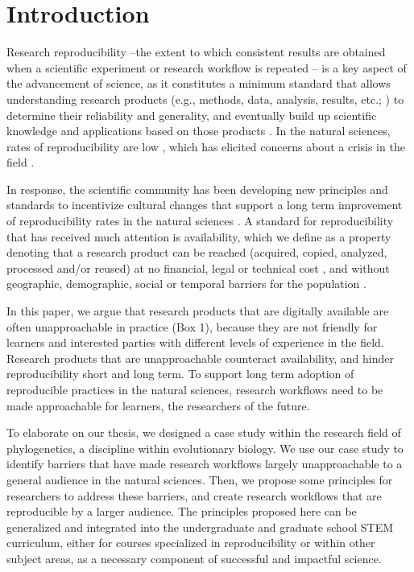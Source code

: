 \documentclass[12pt]{article}
\begin{document}
\newpage
{} %
\section*{Introduction}
\label{sec:intro}

Research reproducibility --the extent to which consistent results are obtained when
a scientific experiment or research workflow is repeated \citep{repdef2021}--
is a key aspect of the advancement
of science, as it constitutes a minimum standard that allows understanding research products
(e.g., methods, data, analysis, results, etc.; \cite{piwowar2013value})
to determine their reliability and generality, and eventually build up scientific
knowledge and applications based on those products
\citep{king1995replication, peng2011reproducible, powers2019open}.
In the natural sciences, rates of reproducibility are low \citep{ioannidis2005most, prinz2011believe},
which has elicited concerns about a crisis in the field \citep{baker2016reproducibility}.

In response, the scientific community has been developing new principles and standards to incentivize
cultural changes that support a long term improvement of reproducibility rates in the natural sciences
\citep{peng2015reproducibility, wilkinson2016fair, miyakawa2020no}.
A standard for reproducibility that has received much attention is availability, which
we define as a property denoting that a research product can be reached (acquired, copied, analyzed,
processed and/or reused) at no financial, legal or technical cost \citep{arnold2019turing},
and without geographic, demographic, social or temporal barriers for the population \citep{fecher2014open}.

In this paper, we argue that research products that are digitally available are
often unapproachable in practice (Box 1), because they are not
friendly for learners and interested parties with different levels of
experience in the field. Research products that are unapproachable
counteract availability, and hinder reproducibility short and long term.
To support long term adoption of reproducible practices in the natural sciences, research
workflows need to be made approachable for learners, the researchers of the future.

To elaborate on our thesis, we designed a case study within the research field of
phylogenetics, a discipline within evolutionary biology.
We use our case study to identify barriers that have made research workflows
largely unapproachable to a general audience in the natural sciences.
Then, we propose some principles for researchers to address these barriers, and
create research workflows that are reproducible by a larger audience.
The principles proposed here can be generalized and integrated into the undergraduate
and graduate school STEM curriculum, either for courses specialized in reproducibility
or within other subject areas, as a necessary component of successful and impactful science.
\end{document}
